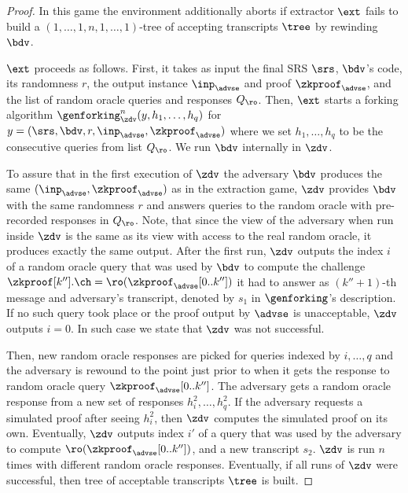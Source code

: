 \begin{proof}
	In this game the environment additionally aborts if extractor $\ext$ fails to build a
	$(1, \ldots, 1, n, 1, \ldots, 1)$-tree of accepting transcripts $\tree$ by rewinding
	$\bdv$.
	
	$\ext$ proceeds as follows. First, it takes as input the final SRS $\srs$,
	$\bdv$'s code, its randomness $r$, the output instance $\inp_{\advse}$ and proof
	$\zkproof_{\advse}$, and the list of random oracle queries and responses
	$Q_\ro$. Then, $\ext$ starts a forking algorithm
	$\genforking^{n}_\zdv(y,h_1, \ldots, h_q)$ for
	$y = (\srs, \bdv, r, \inp_{\advse}, \zkproof_{\advse})$ where we set
	$h_1, \ldots, h_q$ to be the consecutive queries from list $Q_\ro$. We run $\bdv$
	internally in $\zdv$. 
	
	To assure that in the first execution of $\zdv$ the adversary $\bdv$ produces the
	same $(\inp_{\advse}, \zkproof_{\advse})$ as in the extraction game, $\zdv$ provides
	$\bdv$ with the same randomness $r$ and answers queries to the random oracle with
	pre-recorded responses in $Q_\ro$.
	Note, that since the view of the adversary when run inside $\zdv$ is the same as its
	view with access to the real random oracle, it produces exactly the same
	output. After the first run, $\zdv$ outputs the index $i$ of a random oracle query
	that was used by $\bdv$ to compute the challenge
	$\zkproof[k''].\ch = \ro(\zkproof_{\advse}[0..k''])$ it had to answer as
	$(k'' + 1)$-th message and adversary's transcript, denoted by $s_1$ in
	$\genforking$'s description. If no such query took place or the proof output by
	$\advse$ is unacceptable, $\zdv$ outputs $i = 0$. In such case we state that $\zdv$
	was not successful.
	
	Then, new random oracle responses are picked for queries indexed by $i, \ldots, q$
	and the adversary is rewound to the point just prior to when it gets the response to
	random oracle query $\zkproof_{\advse}[0..k'']$. The adversary gets a random oracle response from
	a new set of responses $h^2_i, \ldots, h^2_q$. If the adversary requests a simulated
	proof after seeing $h^2_i$, then $\zdv$ computes the simulated proof on its
	own. Eventually, $\zdv$ outputs index $i'$ of a query that was used by the adversary
	to compute $\ro(\zkproof_{\advse}[0..k''])$, and a new transcript $s_2$. $\zdv$ is run
	$n$ times with different random oracle responses.  Eventually, if all runs of $\zdv$
	were successful, then tree of acceptable transcripts $\tree$ is built.
	

\end{proof}
